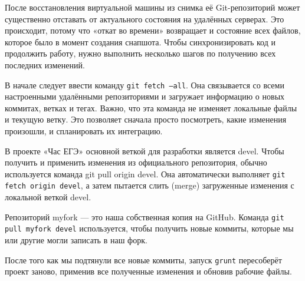 После восстановления виртуальной машины из снимка её Git-репозиторий может существенно отставать от актуального состояния на удалённых серверах. Это происходит, потому что «откат во времени» возвращает и состояние всех файлов, которое было в момент создания снапшота. Чтобы синхронизировать код и продолжить работу, нужно выполнить несколько шагов по получению всех последних изменений.

В начале следует ввести команду \texttt{git fetch --all}. Она связывается со всеми настроенными удалёнными репозиториями и загружает информацию о новых коммитах, ветках и тегах. Важно, что эта команда не изменяет локальные файлы и текущую ветку. Это позволяет сначала просто посмотреть, какие изменения произошли, и спланировать их интеграцию.

В проекте «Час ЕГЭ» основной веткой для разработки является devel. Чтобы получить и применить изменения из официального репозитория, обычно используется команда git pull origin devel. Она автоматически выполняет \texttt{git fetch origin devel}, а затем пытается слить (merge) загруженные изменения с локальной веткой devel.

Репозиторий myfork — это наша собственная копия на GitHub. Команда \texttt{git pull myfork devel} используется, чтобы получить новые коммиты, которые мы или другие могли записать в наш форк.

После того как мы подтянули все новые коммиты, запуск \texttt{grunt} пересоберёт проект заново, применив все полученные изменения и обновив рабочие файлы.